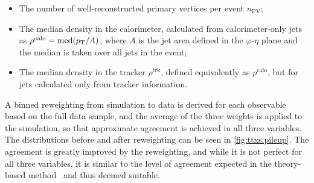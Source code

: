 \begin{itemize}
    \item The number of well-reconstructed primary vertices per event $n_{\mathrm{PV}}$;
    \item The median \pt density in the calorimeter, calculated from calorimeter-only jets as $\rho^{\mathrm{calo}} = \mathrm{med} (p_{\mathrm{T}} / A)$, where $A$ is the jet area defined in the $\varphi$-$\eta$ plane and the median is taken over all jets in the event;
    \item The median \pt density in the tracker $\rho^{\mathrm{trk}}$, defined equivalently as $\rho^{\mathrm{calo}}$, but for jets calculated only from tracker information.
\end{itemize}

A binned reweighting from simulation to data is derived for each observable based on the full data sample, and the average of the three weights is applied to the simulation, so that approximate agreement is achieved in all three variables. The distributions before and after reweighting can be seen in \cref{fig:ttxs:pileup}. The agreement is greatly improved by the reweighting, and while it is not perfect for all three variables, it is similar to the level of agreement expected in the theory-based method~\cite{CMS:LUM-17-003} and thus deemed suitable.


